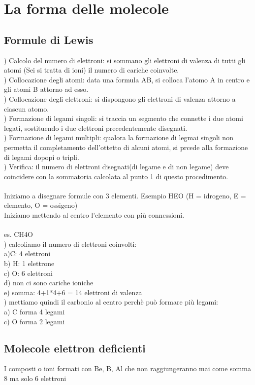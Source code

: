 \section{La forma delle molecole}
\subsection{Formule di Lewis}
) Calcolo del numero di elettroni: si sommano gli elettroni di valenza di tutti gli atomi (Sei si tratta di ioni) il numero di cariche coinvolte.\\
) Collocazione degli atomi: data una formula AB, si colloca l’atomo A in centro e gli atomi B attorno ad esso.\\
) Collocazione degli elettroni: si dispongono gli elettroni di valenza attorno a ciascun atomo.\\
) Formazione di legami singoli: si traccia un segmento che connette i due atomi legati, sostituendo i due elettroni precedentemente disegnati.\\
) Formazione di legami multipli: qualora la formazione di legmai singoli non permetta il completamento dell’ottetto di alcuni atomi, si prcede alla formazione di legami dopopi o tripli.\\
) Verifica: il numero di elettroni disegnati(di legame e di non legame) deve coincidere con la sommatoria calcolata al punto 1 di questo procedimento.\\\\
Iniziamo a disegnare formule con 3 elementi. Esempio HEO (H = idrogeno, E = elemento, O = ossigeno)\\
Iniziamo mettendo al centro l’elemento con più connessioni. \\\\
es. CH4O\\
) calcoliamo il numero di elettroni coinvolti:\\
\tab\tab a)C:  4 elettroni\\
\tab\tab b) H:  1 elettrone\\
\tab\tab c) O:  6 elettroni\\
\tab\tab d) non ci sono cariche ioniche\\
\tab\tab e) somma: 4+1*4+6 = 14 elettroni di valenza\\
) mettiamo quindi il carbonio al centro perchè può formare più legami:\\
\tab\tab a) C forma 4 legami\\
\tab\tab c) O forma 2 legami
\subsection{Molecole elettron deficienti}
I composti o ioni formati con Be, B, Al che non raggiungeranno mai come somma 8 ma solo 6 elettroni

